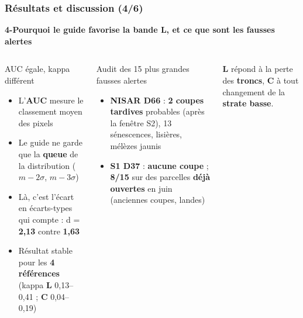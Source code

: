 \documentclass[aspectratio=169]{beamer}
\newcommand{\Lb}[1]{\textcolor{Lband}{\textbf{#1}}}
\newcommand{\Cb}[1]{\textcolor{Cband}{\textbf{#1}}}
\newcommand{\slidesubtitle}[1]{%
	\textcolor{myblue}{\small\textbf{#1}}%
	\par\vspace{3pt}%
}
\begin{document}
\begin{frame}{\phantom{x}}
	\frametitle{Résultats et discussion (4/6)}
	\slidesubtitle{4-Pourquoi le guide favorise la bande L, et ce que sont les fausses alertes}
	\begin{columns}[T]
		\begin{block}{AUC égale, kappa différent}
			\footnotesize
			\begin{itemize}
				\setlength{\itemsep}{3pt}
				\item L'\textbf{AUC} mesure le classement moyen des pixels
				\item Le guide ne garde que la \textbf{queue} de la distribution ($m-2\sigma$, $m-3\sigma$)
				\item Là, c'est l'écart en écarts-types qui compte : d = \Lb{2,13} contre \Cb{1,63}
				\item Résultat stable pour les \textbf{4 références} (kappa \Lb{L} 0,13--0,41 ; \Cb{C} 0,04--0,19)
			\end{itemize}
		\end{block}

		\begin{block}{Audit des 15 plus grandes fausses alertes}
			\footnotesize
			\begin{itemize}
				\setlength{\itemsep}{3pt}
				\item \Lb{NISAR D66} : \textbf{2 coupes tardives} probables (après la fenêtre S2), 13 sénescences,
				lisières, mélèzes jaunis
				\item \Cb{S1 D37} : \textbf{aucune coupe} ; \textbf{8/15} sur des parcelles \textbf{déjà ouvertes}
				en juin (anciennes coupes, landes)
			\end{itemize}
		\end{block}
		\vspace{2pt}
		\footnotesize \Lb{L} répond à la perte des \textbf{troncs}, \Cb{C} à tout changement de la
		\textbf{strate basse}.
	\end{columns}
\end{frame}
\end{document}
